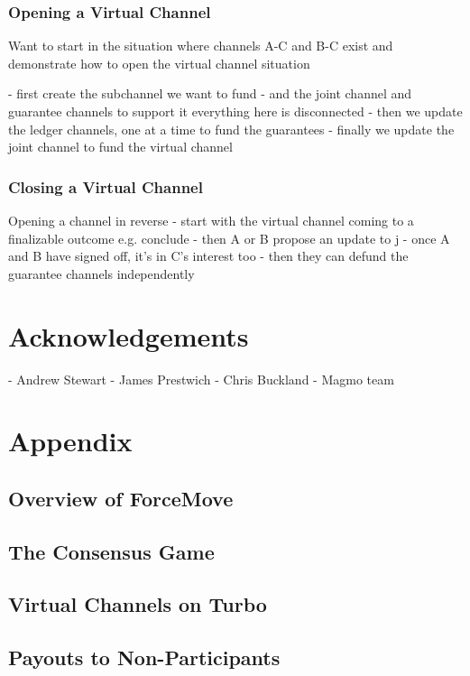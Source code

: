 \documentclass{article}
\theoremstyle{definition}
\begin{document}
\subsubsection{Opening a Virtual Channel}

Want to start in the situation where channels A-C and B-C exist and demonstrate how to
open the virtual channel situation

- first create the subchannel we want to fund
- and the joint channel and guarantee channels to support it
everything here is disconnected
- then we update the ledger channels, one at a time to fund the guarantees
- finally we update the joint channel to fund the virtual channel

\subsubsection{Closing a Virtual Channel}

Opening a channel in reverse
- start with the virtual channel coming to a finalizable outcome e.g. conclude
- then A or B propose an update to j
- once A and B have signed off, it's in C's interest too
- then they can defund the guarantee channels independently


\section{Acknowledgements}

- Andrew Stewart
- James Prestwich
- Chris Buckland
- Magmo team


\section{Appendix}

\subsection{Overview of ForceMove}
\subsection{The Consensus Game}
\subsection{Virtual Channels on Turbo}
\subsection{Payouts to Non-Participants}
\end{document}
